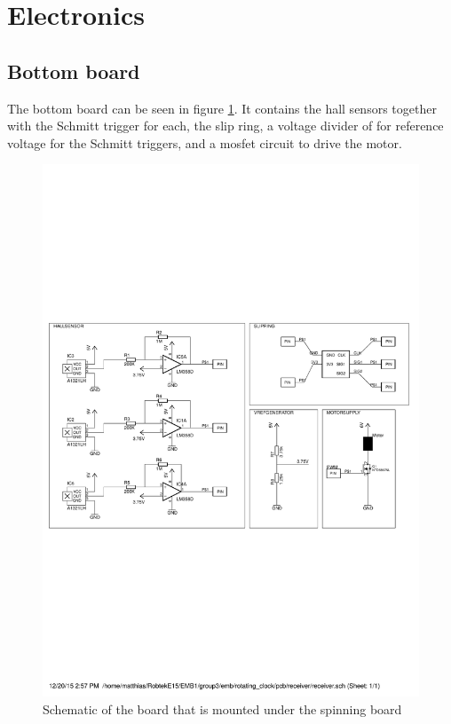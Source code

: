 \section{Electronics}
 
\subsection{Bottom board}
The bottom board can be seen in figure \ref{fig:botm_schematic}.
It contains the hall sensors together with the Schmitt trigger for each, the slip ring, a voltage divider of for reference voltage for the Schmitt triggers, and a mosfet circuit to drive the motor. 
\begin{figure}
 \centering
 \includegraphics[scale=0.7,trim = 0 9cm 0 8cm,clip = true]{img/bottompcb_schematic}
 \caption{Schematic of the board that is mounted under the spinning board}
 \label{fig:botm_schematic}
\end{figure}

